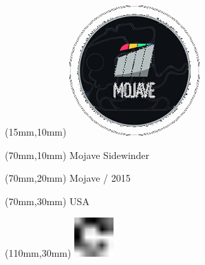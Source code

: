 \null\newpage
\begin{textblock*}{50mm}(15mm,10mm)%
\includegraphics[width=50mm]{LG/MOJ.png}
\end{textblock*}
\begin{textblock*}{130mm}(70mm,10mm)%
{\fontsize{20}{20}\selectfont Mojave Sidewinder}\\
\end{textblock*}
\begin{textblock*}{120mm}(70mm,20mm)%
{\fontsize{16}{16}\selectfont Mojave / 2015}\\
\end{textblock*}
\begin{textblock*}{120mm}(70mm,30mm)%
{\fontsize{12}{12}\selectfont USA}
\end{textblock*}
\begin{textblock*}{30mm}(110mm,30mm)%
\centering
\includegraphics[height=15mm]{icons/fa-rotate-right.pdf}
\end{textblock*}
